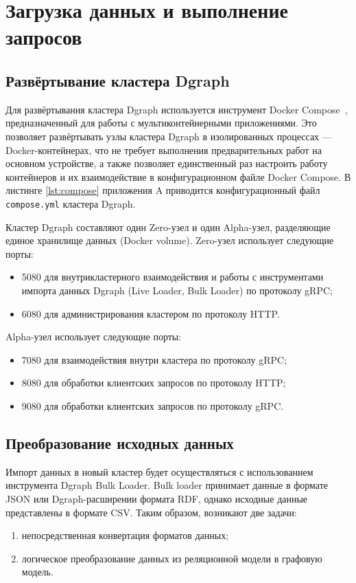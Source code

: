 \section{Загрузка данных и выполнение запросов}

\subsection{Развёртывание кластера Dgraph}

Для развёртывания кластера Dgraph используется инструмент Docker Compose~\cite{dockerCompose}, предназначенный для работы
с мультиконтейнерными приложениями. Это позволяет развёртывать узлы кластера Dgraph в изолированных процессах ---
Docker-контейнерах, что не требует выполнения предварительных работ на основном устройстве, а также позволяет единственный
раз настроить работу контейнеров и их взаимодействие в конфигурационном файле Docker Compose. В листинге \ref{lst:compose}
приложения A приводится конфигурационный файл \texttt{compose.yml} кластера Dgraph.

Кластер Dgraph составляют один Zero-узел и один Alpha-узел, разделяющие единое хранилище данных (Docker volume). Zero-узел
использует следующие порты:
\begin{itemize}
  \item 5080 для внутрикластерного взаимодействия и работы с инструментами импорта данных Dgraph (Live Loader, Bulk Loader)
    по протоколу gRPC;
  \item 6080 для администрирования кластером по протоколу HTTP.
\end{itemize}

Alpha-узел использует следующие порты:
\begin{itemize}
  \item 7080 для взаимодействия внутри кластера по протоколу gRPC;
  \item 8080 для обработки клиентских запросов по протоколу HTTP;
  \item 9080 для обработки клиентских запросов по протоколу gRPC.
\end{itemize}

\subsection{Преобразование исходных данных}

Импорт данных в новый кластер будет осуществляться с использованием инструмента Dgraph Bulk Loader. Bulk loader принимает
данные в формате JSON или Dgraph-расширении формата RDF, однако исходные данные представлены в формате CSV. Таким образом,
возникают две задачи:
\begin{enumerate}
  \item непосредственная конвертация форматов данных;
  \item логическое преобразование данных из реляционной модели в графовую модель.
\end{enumerate}

